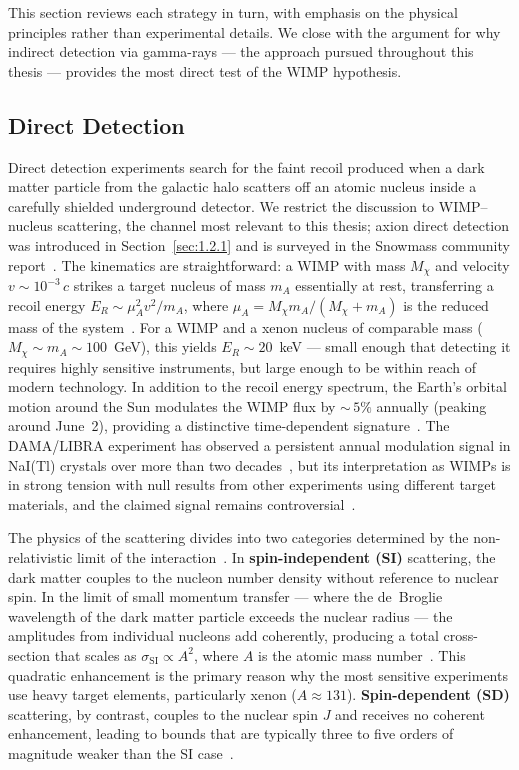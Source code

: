 This section reviews each strategy in turn, with emphasis on the physical principles rather than experimental details.
We close with the argument for why indirect detection via gamma-rays --- the approach pursued throughout this thesis --- provides the most direct test of the WIMP hypothesis.

\subsection{Direct Detection}
\label{sec:1.3.1}

Direct detection experiments search for the faint recoil produced when a dark matter particle from the galactic halo scatters off an atomic nucleus inside a carefully shielded underground detector.
We restrict the discussion to WIMP--nucleus scattering, the channel most relevant to this thesis; axion direct detection was introduced in Section~\ref{sec:1.2.1} and is surveyed in the Snowmass community report~\cite{Adams:2022pbo}.
The kinematics are straightforward: a WIMP with mass $M_\chi$ and velocity $v \sim 10^{-3}\,c$ strikes a target nucleus of mass $m_A$ essentially at rest, transferring a recoil energy $E_R \sim \mu_A^2 v^2 / m_A$, where $\mu_A = M_\chi m_A / (M_\chi + m_A)$ is the reduced mass of the system~\cite{Dodelson:2020bqr}.
For a WIMP and a xenon nucleus of comparable mass ($M_\chi \sim m_A \sim 100$~GeV), this yields $E_R \sim 20$~keV --- small enough that detecting it requires highly sensitive instruments, but large enough to be within reach of modern technology.
In addition to the recoil energy spectrum, the Earth's orbital motion around the Sun modulates the WIMP flux by ${\sim}\,5\%$ annually (peaking around June~2), providing a distinctive time-dependent signature~\cite{Drukier:1986tm}.
The DAMA/LIBRA experiment has observed a persistent annual modulation signal in NaI(Tl) crystals over more than two decades~\cite{Bernabei:2018yyw}, but its interpretation as WIMPs is in strong tension with null results from other experiments using different target materials, and the claimed signal remains controversial~\cite{ANAIS-112:2025fne}.

The physics of the scattering divides into two categories determined by the non-relativistic limit of the interaction~\cite{Cirelli:2024ssz,Hooper:2024}.
In \textbf{spin-independent (SI)} scattering, the dark matter couples to the nucleon number density without reference to nuclear spin.
In the limit of small momentum transfer --- where the de~Broglie wavelength of the dark matter particle exceeds the nuclear radius --- the amplitudes from individual nucleons add coherently, producing a total cross-section that scales as $\sigma_\text{SI} \propto A^2$, where $A$ is the atomic mass number~\cite{Cirelli:2024ssz,Hooper:2024}.
This quadratic enhancement is the primary reason why the most sensitive experiments use heavy target elements, particularly xenon ($A \approx 131$).
\textbf{Spin-dependent (SD)} scattering, by contrast, couples to the nuclear spin $J$ and receives no coherent enhancement, leading to bounds that are typically three to five orders of magnitude weaker than the SI case~\cite{Cirelli:2024ssz}.

